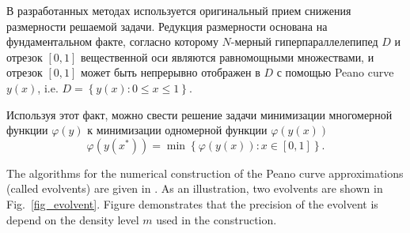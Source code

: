\documentclass{svproc}
\begin{document}
В разработанных методах используется оригинальный прием снижения размерности решаемой задачи. 
Редукция размерности основана на фундаментальном факте, согласно которому $N$-мерный гиперпараллелепипед $D$ и отрезок $[0,1]$ вещественной оси являются равномощными множествами, и отрезок $[0,1]$ может быть непрерывно отображен в $D$ с помощью Peano curve $y(x)$, i.e. $D = \left\{y(x):0\leq x\leq 1\right\}$.

Используя этот факт, можно свести решение задачи минимизации многомерной функции $\varphi(y)$ к минимизации одномерной функции $\varphi(y(x))$
\begin{equation}\label{1d_problem}
\varphi(y (x^*)) = \min \left\{ \varphi (y(x)) : x\in [0,1] \right\}.
\end{equation}

The algorithms for the numerical construction of the Peano curve approximations (called evolvents)
are given in \cite{Strongin2000,Sergeyev2013}. As an illustration, two evolvents are shown in Fig.~\ref{fig_evolvent}. Figure demonstrates that the precision of the evolvent is depend on the density level $m$ used in the construction.
\end{document}
